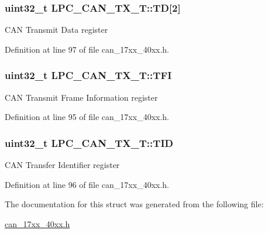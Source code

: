 \subsubsection[{\texorpdfstring{TD}{TD}}]{ uint32\+\_\+t L\+P\+C\+\_\+\+C\+A\+N\+\_\+\+T\+X\+\_\+\+T\+::\+TD\mbox{[}2\mbox{]}}\hypertarget{structLPC__CAN__TX__T_ab41475b9f2b0952da4e71f74cfe33c20}{}\label{structLPC__CAN__TX__T_ab41475b9f2b0952da4e71f74cfe33c20}
C\+AN Transmit Data register 

Definition at line 97 of file can\+\_\+17xx\+\_\+40xx.\+h.

\subsubsection[{\texorpdfstring{T\+FI}{TFI}}]{ uint32\+\_\+t L\+P\+C\+\_\+\+C\+A\+N\+\_\+\+T\+X\+\_\+\+T\+::\+T\+FI}\hypertarget{structLPC__CAN__TX__T_a10a4c2076dd63148d4e9e4ad32af1451}{}\label{structLPC__CAN__TX__T_a10a4c2076dd63148d4e9e4ad32af1451}
C\+AN Transmit Frame Information register 

Definition at line 95 of file can\+\_\+17xx\+\_\+40xx.\+h.

\subsubsection[{\texorpdfstring{T\+ID}{TID}}]{ uint32\+\_\+t L\+P\+C\+\_\+\+C\+A\+N\+\_\+\+T\+X\+\_\+\+T\+::\+T\+ID}\hypertarget{structLPC__CAN__TX__T_a7a98a061fcb602592c5b6a17810a42c3}{}\label{structLPC__CAN__TX__T_a7a98a061fcb602592c5b6a17810a42c3}
C\+AN Transfer Identifier register 

Definition at line 96 of file can\+\_\+17xx\+\_\+40xx.\+h.



The documentation for this struct was generated from the following file\+:\begin{DoxyCompactItemize}
\item 
\hyperlink{can__17xx__40xx_8h}{can\+\_\+17xx\+\_\+40xx.\+h}\end{DoxyCompactItemize}
